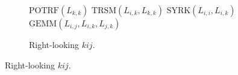 \documentclass[sigplan, nonacm]{acmart}
\newenvironment{codepanel}{%
  \begin{lrbox}{\codepanelbox}%
  \begin{minipage}{\dimexpr\linewidth-8pt\relax}%
}{%
  \end{minipage}%
  \end{lrbox}%
  \setlength{\fboxsep}{4pt}%
  \colorbox{codebg}{\usebox{\codepanelbox}}%
}
\begin{document}
\begin{figure}[t]
\centering
\begin{minipage}[t]{0.49\linewidth}
\vspace*{0pt}
\begin{subfigure}[t]{\linewidth}
\centering
\scriptsize
\begin{codepanel}
\begin{algorithmic}
    \State $\text{POTRF}(L_{k,k})$
        \State $\text{TRSM}(L_{i,k}, L_{k,k})$
    \EndFor
        \State $\text{SYRK}(L_{i,i}, L_{i,k})$
            \State $\text{GEMM}(L_{i,j}, L_{i,k}, L_{j,k})$
        \EndFor
    \EndFor
\EndFor
\end{algorithmic}
\end{codepanel}
\caption{Right-looking $kij$.}
\label{fig:chol-kij}
\end{subfigure}

\vspace{0.6em}


\end{minipage}
\end{figure}
\end{document}
